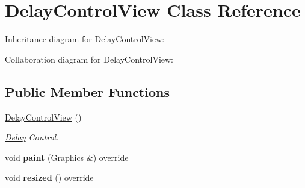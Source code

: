\hypertarget{class_delay_control_view}{}\section{Delay\+Control\+View Class Reference}
\label{class_delay_control_view}


Inheritance diagram for Delay\+Control\+View\+:


Collaboration diagram for Delay\+Control\+View\+:
\subsection*{Public Member Functions}
\begin{DoxyCompactItemize}
\item 
\hyperlink{class_delay_control_view_a644b894204d992f7cb5e18edb6a32556}{Delay\+Control\+View} ()\hypertarget{class_delay_control_view_a644b894204d992f7cb5e18edb6a32556}{}\label{class_delay_control_view_a644b894204d992f7cb5e18edb6a32556}

\begin{DoxyCompactList}\small\item\em \hyperlink{class_delay}{Delay} Control. \end{DoxyCompactList}\item 
void {\bfseries paint} (Graphics \&) override\hypertarget{class_delay_control_view_a81ad36864725ae108858ad420e41cb00}{}\label{class_delay_control_view_a81ad36864725ae108858ad420e41cb00}

\item 
void {\bfseries resized} () override\hypertarget{class_delay_control_view_ae9af0373f688ba9c089f0eeac942c11f}{}\label{class_delay_control_view_ae9af0373f688ba9c089f0eeac942c11f}

\end{DoxyCompactItemize}
